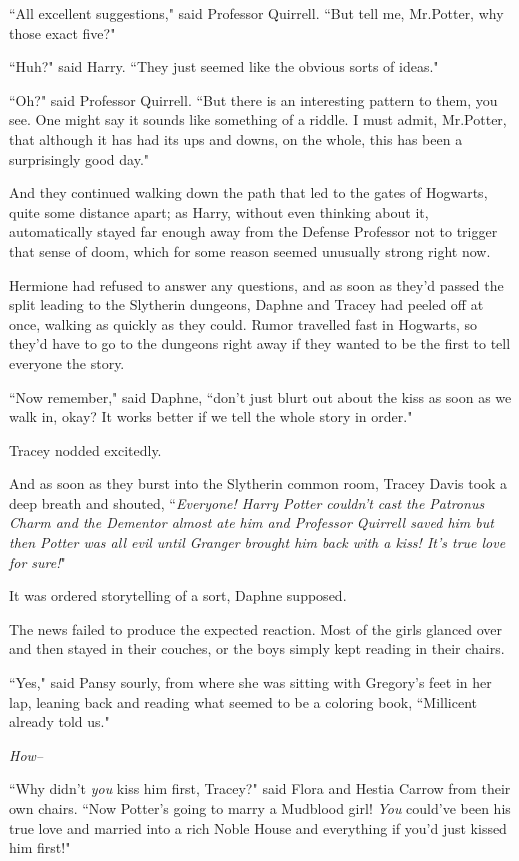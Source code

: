 ``All excellent suggestions," said Professor Quirrell. ``But tell me, Mr.\?Potter, why those exact five?"

``Huh?" said Harry. ``They just seemed like the obvious sorts of ideas."

``Oh?" said Professor Quirrell. ``But there is an interesting pattern to them, you see. One might say it sounds like something of a riddle. I must admit, Mr.\?Potter, that although it has had its ups and downs, on the whole, this has been a surprisingly good day."

And they continued walking down the path that led to the gates of Hogwarts, quite some distance apart; as Harry, without even thinking about it, automatically stayed far enough away from the Defense Professor not to trigger that sense of doom, which for some reason seemed unusually strong right now.


Hermione had refused to answer any questions, and as soon as they'd passed the split leading to the Slytherin dungeons, Daphne and Tracey had peeled off at once, walking as quickly as they could. Rumor travelled fast in Hogwarts, so they'd have to go to the dungeons right away if they wanted to be the first to tell everyone the story.

``Now remember," said Daphne, ``don't just blurt out about the kiss as soon as we walk in, okay? It works better if we tell the whole story in order."

Tracey nodded excitedly.

And as soon as they burst into the Slytherin common room, Tracey Davis took a deep breath and shouted, ``\emph{Everyone! Harry Potter couldn't cast the Patronus Charm and the Dementor almost ate him and Professor Quirrell saved him but then Potter was all evil until Granger brought him back with a kiss! It's true love for sure!}"

It was ordered storytelling of a sort, Daphne supposed.

The news failed to produce the expected reaction. Most of the girls glanced over and then stayed in their couches, or the boys simply kept reading in their chairs.

``Yes," said Pansy sourly, from where she was sitting with Gregory's feet in her lap, leaning back and reading what seemed to be a coloring book, ``Millicent already told us."

\emph{How\---}

``Why didn't \emph{you} kiss him first, Tracey?" said Flora and Hestia Carrow from their own chairs. ``Now Potter's going to marry a Mudblood girl! \emph{You} could've been his true love and married into a rich Noble House and everything if you'd just kissed him first!"

